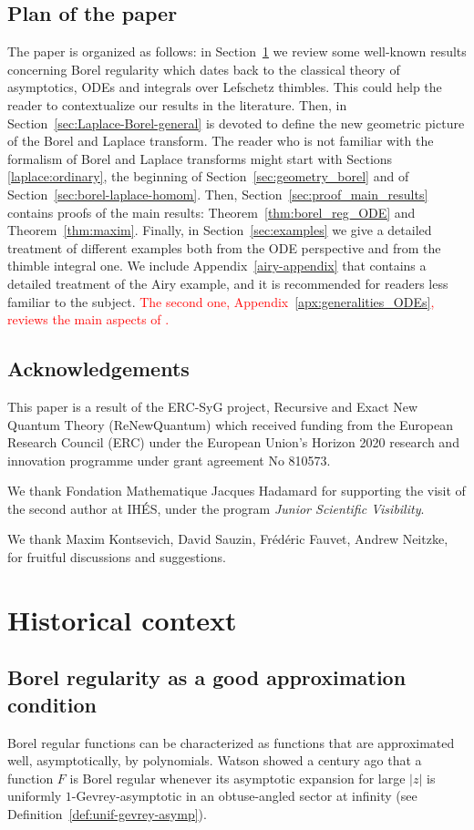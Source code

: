 \documentclass{article}
\theoremstyle{definition}
\theoremstyle{plain}
\begin{document}
\subsection{Plan of the paper}
The paper is organized as follows: in Section~\ref{sec:historical-context} we review some well-known results concerning Borel regularity which dates back to the classical theory of asymptotics, ODEs and integrals over Lefschetz thimbles. This could help the reader to contextualize our results in the literature. Then, in Section~\ref{sec:Laplace-Borel-general} is devoted to define the new geometric picture of the Borel and Laplace transform. The reader who is not familiar with the formalism of Borel and Laplace transforms might start with Sections \ref{laplace:ordinary}, the beginning of Section~\ref{sec:geometry_borel} and of Section~\ref{sec:borel-laplace-homom}. Then, Section~\ref{sec:proof_main_results} contains proofs of the main results: Theorem~\ref{thm:borel_reg_ODE} and Theorem~\ref{thm:maxim}. Finally, in Section~\ref{sec:examples} we give a detailed treatment of different examples both from the ODE perspective and from the thimble integral one. 
We include Appendix~\ref{airy-appendix} that contains a detailed treatment of the Airy example, and it is recommended for readers less familiar to the subject. \textcolor{red}{The second one, Appendix~\ref{apx:generalities_ODEs}, reviews the main aspects of \cite{reg-sing-volterra}.}  
%
\subsection{Acknowledgements}
This paper is a result of the ERC-SyG project, Recursive and Exact New Quantum Theory (ReNewQuantum) which received funding from the European Research Council (ERC) under the European Union's Horizon 2020 research and innovation programme under grant agreement No 810573. 

We thank Fondation Mathematique Jacques Hadamard for supporting the visit of the second author at IH\'ES, under the program \textit{Junior Scientific Visibility}. 

We thank Maxim Kontsevich, David Sauzin, Fr\'ed\'eric Fauvet, Andrew Neitzke, for fruitful discussions and suggestions. 
%
\section{Historical context}\label{sec:historical-context}
%
\subsection{Borel regularity as a good approximation condition}
Borel regular functions can be characterized as functions that are approximated well, asymptotically, by polynomials. Watson showed a century ago \cite[Part II, Section 9]{watson2} that a function $F$ is Borel regular whenever its asymptotic expansion for large $|z|$ is uniformly $1$-Gevrey-asymptotic in an obtuse-angled sector at infinity (see Definition~\ref{def:unif-gevrey-asymp}).
\end{document}
